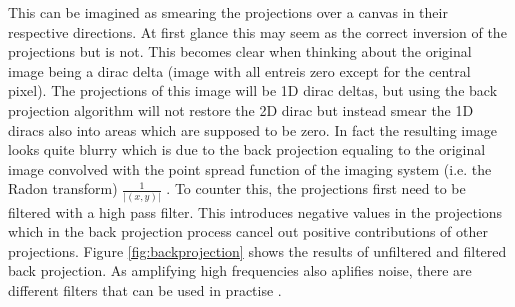 \documentclass[10pt,journal,compsoc]{IEEEtran}
\begin{document}
This can be imagined as smearing the projections over a canvas in their respective directions.
At first glance this may seem as the correct inversion of the projections but is not.
This becomes clear when thinking about the original image being a dirac delta (image with all entreis zero except for the central pixel).
The projections of this image will be 1D dirac deltas, but using the back projection algorithm will not
restore the 2D dirac but instead smear the 1D diracs also into areas which are supposed to be zero.
In fact the resulting image looks quite blurry which is due to the back projection equaling to the original image convolved with the point spread function of the imaging system (i.e. the Radon transform) $\frac{1}{|(x,y)|}$ \cite{Buzug2008_chap5}.
To counter this, the projections first need to be filtered with a high pass filter.
This introduces negative values in the projections which in the back projection process cancel out positive contributions of other projections.
Figure \cref{fig:backprojection} shows the results of unfiltered and filtered back projection.
As amplifying high frequencies also aplifies noise, there are different filters that can be used in practise \cite{farquhar1998}.
%
\end{document}
